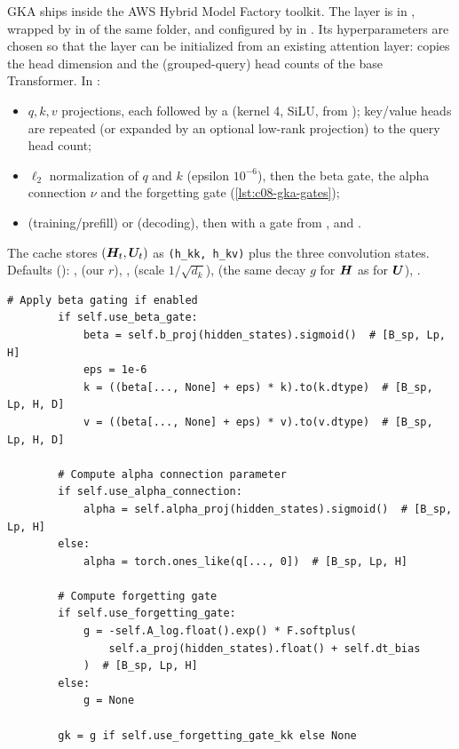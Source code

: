\begin{implnote}[title={In the code: the GKA layer}]
GKA ships inside the AWS Hybrid Model Factory toolkit. The layer is  in
,
wrapped by  in  of the same folder, and configured by
 in . Its hyperparameters are chosen so that the layer can be
initialized from an existing attention layer:  copies the head
dimension and the (grouped-query) head counts of the base Transformer. In :
\begin{itemize}
  \item $q,k,v$ projections, each followed by a  (kernel 4, SiLU, from
  \fla); key/value heads are repeated (or expanded by an optional low-rank projection) to the
  query head count;
  \item $\ell_2$ normalization of $q$ and $k$ (epsilon $10^{-6}$), then the beta gate, the
  alpha connection $\nu$ and the forgetting gate (\cref{lst:c08-gka-gates});
  \item {} (training/prefill) or  (decoding),
  then  with a gate from , and .
\end{itemize}
The cache stores $(\bm{H}_t,\bm{U}_t)$ as \texttt{(h\_kk,~h\_kv)} plus the three convolution states. Defaults
(): ,  (our $r$), ,
 (scale $1/\sqrt{d_k}$),  (the same decay
$g$ for $\bm{H}$ as for $\bm{U}$), .
\end{implnote}

\begin{lstlisting}[caption={Excerpt from \texttt{repos/\allowbreak awslabs\_\_hybrid-model-factory/\allowbreak training/\allowbreak src/\allowbreak hmf/\allowbreak model/\allowbreak hybrid\_zoo/\allowbreak layers/\allowbreak gated\_kalmanet/\allowbreak gka.py} (method \texttt{GatedKalmaNet.forward}).},label={lst:c08-gka-gates}]
        # Apply beta gating if enabled
        if self.use_beta_gate:
            beta = self.b_proj(hidden_states).sigmoid()  # [B_sp, Lp, H]
            eps = 1e-6
            k = ((beta[..., None] + eps) * k).to(k.dtype)  # [B_sp, Lp, H, D]
            v = ((beta[..., None] + eps) * v).to(v.dtype)  # [B_sp, Lp, H, D]

        # Compute alpha connection parameter
        if self.use_alpha_connection:
            alpha = self.alpha_proj(hidden_states).sigmoid()  # [B_sp, Lp, H]
        else:
            alpha = torch.ones_like(q[..., 0])  # [B_sp, Lp, H]

        # Compute forgetting gate
        if self.use_forgetting_gate:
            g = -self.A_log.float().exp() * F.softplus(
                self.a_proj(hidden_states).float() + self.dt_bias
            )  # [B_sp, Lp, H]
        else:
            g = None

        gk = g if self.use_forgetting_gate_kk else None
\end{lstlisting}


